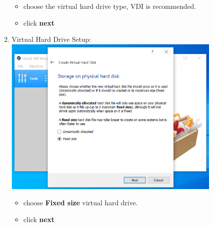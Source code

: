 \documentclass[12pt]{article}
\begin{document}
\begin{description}
\begin{description}
\begin{enumerate}[label=\alph*)]
\begin{itemize}
                \item choose the virtual hard drive type, VDI is recommended. 
                \item click {\bf next}
                           
        \end{itemize}

\newpage
\item Virtual Hard Drive Setup: \vspace{5mm} \\

      		\hspace*{-2.5cm}\includegraphics[scale=.55]{Capture8.png}\\
            \begin{itemize}
                
                \item choose {\bf Fixed size} virtual hard drive. 
                \item click {\bf next}
                              
            \end{itemize}


\end{enumerate}
\end{description}
\end{description}
\end{document}
